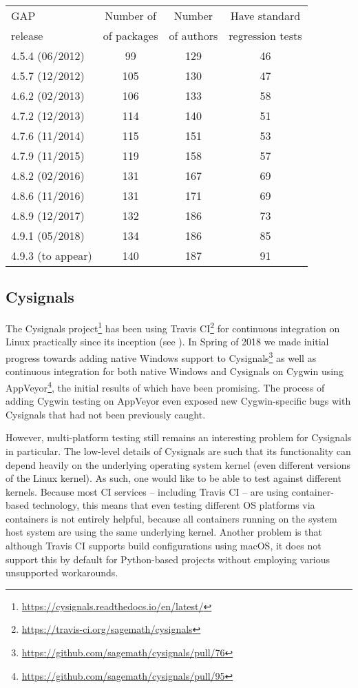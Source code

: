 \documentclass{deliverablereport}
\begin{document}
\begin{center}
\begin{tabular}{ |l|c|c|c| } 
\hline
GAP           & Number of    & Number     & Have standard \\
release       & of packages  & of authors & regression tests \\
\hline
4.5.4 (06/2012) &  99 & 129 & 46 \\
4.5.7 (12/2012) & 105 & 130 & 47 \\
4.6.2 (02/2013) & 106 & 133 & 58 \\
4.7.2 (12/2013) & 114 & 140 & 51 \\
4.7.6 (11/2014) & 115 & 151 & 53 \\
4.7.9 (11/2015) & 119 & 158 & 57 \\
4.8.2 (02/2016) & 131 & 167 & 69 \\
4.8.6 (11/2016) & 131 & 171 & 69 \\
4.8.9 (12/2017) & 132 & 186 & 73 \\
4.9.1 (05/2018) & 134 & 186 & 85 \\
4.9.3 (to appear) & 140 & 187 & 91 \\
\hline
\end{tabular}
\end{center} 


\subsection{Cysignals}

The Cysignals
project\footnote{\url{https://cysignals.readthedocs.io/en/latest/}} has been
using Travis CI\footnote{\url{https://travis-ci.org/sagemath/cysignals}} for
continuous integration on Linux practically since its inception (see ).  In Spring of 2018 we made
initial progress towards adding native Windows support to
Cysignals\footnote{\url{https://github.com/sagemath/cysignals/pull/76}} as well
as continuous integration for both native Windows and Cysignals on Cygwin using
AppVeyor\footnote{\url{https://github.com/sagemath/cysignals/pull/95}}, the
initial results of which have been promising.  The process of adding Cygwin
testing on AppVeyor even exposed new Cygwin-specific bugs with Cysignals that
had not been previously caught.

However, multi-platform testing still remains an interesting problem for
Cysignals in particular.  The low-level details of Cysignals are such that its
functionality can depend heavily on the underlying operating system kernel
(even different versions of the Linux kernel).  As such, one would like to be
able to test against different kernels.  Because most CI services -- including
Travis CI -- are using container-based technology, this means that even testing
different OS platforms via containers is not entirely helpful, because all
containers running on the system host system are using the same underlying
kernel. Another problem is that although Travis CI supports build
configurations using macOS, it does not support this by default for
Python-based projects without employing various unsupported workarounds.
\end{document}
